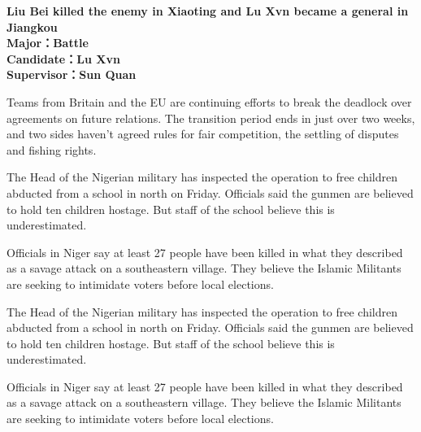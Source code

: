 \documentclass[UTF8,12pt,twoside,a4paper]{ctexart} %
\begin{document}
\begin{titlepage}
\clearpage 





\begin{center}
			 \bfseries
    Liu Bei killed the enemy in Xiaoting and Lu Xvn became a general in Jiangkou
        \\
			\vspace*{36pt}%
			\setmainfont{Times New Roman}
			\textbf{
				{Major：\quad Battle}\\
				{Candidate：\quad Lu Xvn}\\
				{Supervisor：\quad Sun Quan}}\\
				\vspace*{36pt}

 {\setmainfont{Times New Roman}}
	\bfseries{}
\end{center}

Teams from Britain and the EU are continuing efforts to break the deadlock over agreements on future relations. The transition period ends in just over two weeks, and two sides haven't agreed rules for fair competition, the settling of disputes and fishing rights.

The Head of the Nigerian military has inspected the operation to free children abducted from a school in north on Friday. Officials said the gunmen are believed to hold ten children hostage. But staff of the school believe this is underestimated.

Officials in Niger say at least 27 people have been killed in what they described as a savage attack on a southeastern village. They believe the Islamic Militants are seeking to intimidate voters before local elections.

The Head of the Nigerian military has inspected the operation to free children abducted from a school in north on Friday. Officials said the gunmen are believed to hold ten children hostage. But staff of the school believe this is underestimated.

Officials in Niger say at least 27 people have been killed in what they described as a savage attack on a southeastern village. They believe the Islamic Militants are seeking to intimidate voters before local elections.



\end{titlepage}
\end{document}
